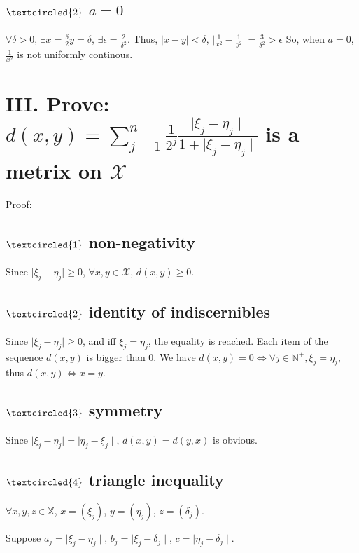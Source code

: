 \documentclass[twoside,a4paper]{article}
\begin{document}
\subsection*{\small{$\textcircled{2}$ $a=0$}}
$\forall \delta > 0$, $\exists x=\frac{\delta}{2} y=\delta$, $\exists \epsilon = \frac{2}{\delta^2}$.
Thus, $\mid x - y \mid < \delta$, $\mid \frac{1}{x^2} - \frac{1}{y^2} \mid = \frac{3}{\delta^2} > \epsilon$
So, when $a = 0$, $\frac{1}{x^2}$ is not uniformly continous.

\section*{III. \small{Prove: $d(x,y) = \sum_{j=1}^{n}\frac{1}{2^j}\frac{\mid\xi_{j} - \eta_{j}\mid}{1 + \mid\xi_{j} - \eta_{j}\mid}$ is a metrix on $\mathcal{X}$}}
Proof:

\subsection*{\small{$\textcircled{1}$ non-negativity}}
Since $\mid\xi_{j} - \eta_{j}\mid \geq 0$, $\forall x,y \in \mathcal{X}$, $d(x,y) \geq 0$.

\subsection*{\small{$\textcircled{2}$ identity of indiscernibles}} 
Since $\mid\xi_{j} - \eta_{j}\mid \geq 0$, and iff $\xi_{j} = \eta_{j}$, the equality is reached. Each item of the sequence $d(x,y)$ is bigger than 0.
We have $d(x,y) = 0 \iff \forall j \in \mathbb{N}^+, \xi_{j} = \eta_{j}$, thus $d(x,y) \iff x = y$. 

\subsection*{\small{$\textcircled{3}$ symmetry}}
Since $\mid\xi_{j} - \eta_{j}\mid = \mid\eta_{j} - \xi_{j}\mid$, $d(x,y) = d(y,x)$ is obvious.

\subsection*{\small{$\textcircled{4}$ triangle inequality}}
$\forall x,y,z \in \mathbb{X}$, $x = (\xi_{j})$, $y = (\eta_{j})$, $z = (\delta_{j})$. 

Suppose $a_{j} = \mid\xi_{j} - \eta_{j}\mid$, $b_{j} = \mid\xi_{j}- \delta_{j}\mid$, $c = \mid\eta_{j} - \delta_{j}\mid$.
\end{document}
